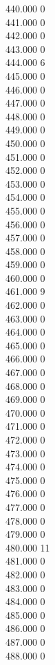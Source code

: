 { 440.000	0 \\
 441.000	0 \\
 442.000	0 \\
 443.000	0 \\
 444.000	6 \\
 445.000	0 \\
 446.000	0 \\
 447.000	0 \\
 448.000	0 \\
 449.000	0 \\
 450.000	0 \\
 451.000	0 \\
 452.000	0 \\
 453.000	0 \\
 454.000	0 \\
 455.000	0 \\
 456.000	0 \\
 457.000	0 \\
 458.000	0 \\
 459.000	0 \\
 460.000	0 \\
 461.000	9 \\
 462.000	0 \\
 463.000	0 \\
 464.000	0 \\
 465.000	0 \\
 466.000	0 \\
 467.000	0 \\
 468.000	0 \\
 469.000	0 \\
 470.000	0 \\
 471.000	0 \\
 472.000	0 \\
 473.000	0 \\
 474.000	0 \\
 475.000	0 \\
 476.000	0 \\
 477.000	0 \\
 478.000	0 \\
 479.000	0 \\
 480.000	11 \\
 481.000	0 \\
 482.000	0 \\
 483.000	0 \\
 484.000	0 \\
 485.000	0 \\
 486.000	0 \\
 487.000	0 \\
 488.000	0 \\
}
